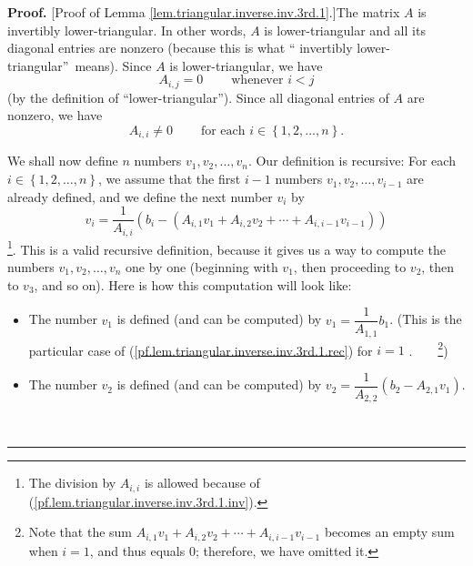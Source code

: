 \documentclass[numbers=enddot,12pt,final,onecolumn,notitlepage]{scrartcl}%
\theoremstyle{definition}
\newenvironment{proof}[1][Proof]{\noindent\textbf{#1.} }{\ \rule{0.5em}{0.5em}}
\begin{document}
\begin{proof}
[Proof of Lemma \ref{lem.triangular.inverse.inv.3rd.1}.]The matrix $A$ is
invertibly lower-triangular. In other words, $A$ is lower-triangular and all
its diagonal entries are nonzero (because this is what \textquotedblleft
invertibly lower-triangular\textquotedblright\ means). Since $A$ is
lower-triangular, we have
\begin{equation}
A_{i,j}=0\ \ \ \ \ \ \ \ \ \ \text{whenever }i<j
\label{pf.lem.triangular.inverse.inv.3rd.1.tria}%
\end{equation}
(by the definition of \textquotedblleft lower-triangular\textquotedblright).
Since all diagonal entries of $A$ are nonzero, we have
\begin{equation}
A_{i,i}\neq0\ \ \ \ \ \ \ \ \ \ \text{for each }i\in\left\{  1,2,\ldots
,n\right\}  . \label{pf.lem.triangular.inverse.inv.3rd.1.inv}%
\end{equation}


We shall now define $n$ numbers $v_{1},v_{2},\ldots,v_{n}$. Our definition is
recursive: For each $i\in\left\{  1,2,\ldots,n\right\}  $, we assume that the
first $i-1$ numbers $v_{1},v_{2},\ldots,v_{i-1}$ are already defined, and we
define the next number $v_{i}$ by%
\begin{equation}
v_{i}=\dfrac{1}{A_{i,i}}\left(  b_{i}-\left(  A_{i,1}v_{1}+A_{i,2}v_{2}%
+\cdots+A_{i,i-1}v_{i-1}\right)  \right)
\label{pf.lem.triangular.inverse.inv.3rd.1.rec}%
\end{equation}
\footnote{The division by $A_{i,i}$ is allowed because of
(\ref{pf.lem.triangular.inverse.inv.3rd.1.inv}).}. This is a valid recursive
definition, because it gives us a way to compute the numbers $v_{1}%
,v_{2},\ldots,v_{n}$ one by one (beginning with $v_{1}$, then proceeding to
$v_{2}$, then to $v_{3}$, and so on). Here is how this computation will look like:

\begin{itemize}
\item The number $v_{1}$ is defined (and can be computed) by $v_{1}=\dfrac
{1}{A_{1,1}}b_{1}$. (This is the particular case of
(\ref{pf.lem.triangular.inverse.inv.3rd.1.rec}) for $i=1$%
.\ \ \ \ \footnote{Note that the sum $A_{i,1}v_{1}+A_{i,2}v_{2}+\cdots
+A_{i,i-1}v_{i-1}$ becomes an empty sum when $i=1$, and thus equals $0$;
therefore, we have omitted it.})

\item The number $v_{2}$ is defined (and can be computed) by $v_{2}=\dfrac
{1}{A_{2,2}}\left(  b_{2}-A_{2,1}v_{1}\right)  $.


\end{itemize}
\end{proof}
\end{document}
